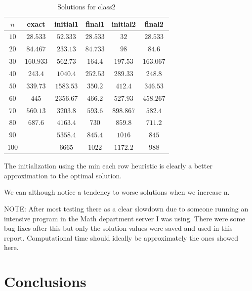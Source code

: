 \documentclass[a4paper, 11pt]{article}
\begin{document}
	\begin{table}[H]
		\centering
		\begin{tabular}{c|c|c|c|c|c}
			\textbf{$ n $} 	& \textbf{exact} & \textbf{initial1}   & \textbf{final1}& \textbf{initial2} & \textbf{final2} 	\\ \hline
			$ 10  $			& $ 28.533 $ 	& $ 52.333 $ 			& $ 28.533 $  	& $ 32 $ 			& $ 28.533 $		\\ \hline
			$ 20  $			& $ 84.467 $ 		& $ 233.13 $ 			& $ 84.733 $  	& $ 98 $ 			& $ 84.6$		\\ \hline
			$ 30  $			& $ 160.933 $ 	& $ 562.73 $ 			& $ 164.4 $  	& $ 197.53 $ 		& $ 163.067 $ \\ \hline
			$ 40  $			& $ 243.4 $ 	& $ 1040.4 $ 			& $ 252.53 $  	& $ 289.33 $ 		& $ 248.8 $ \\ \hline
			$ 50  $			& $ 339.73 $ 		& $ 1583.53 $ 			& $ 350.2 $  	& $ 412.4 $ 		& $ 346.53 $ \\ \hline
			$ 60  $			& $ 445 $ 	& $ 2356.67 $ 			& $ 466.2 $  	& $ 527.93 $ 		& $ 458.267 $ \\ \hline
			$ 70 $			& $ 560.13 $ 	& $ 3203.8 $ 			& $ 593.6 $  	& $ 898.867 $ 		& $ 582.4 $ \\ \hline
			$ 80 $			& $ 687.6 $ 	& $ 4163.4 $ 			& $ 730 $  		& $ 859.8 $ 		& $ 711.2 $ \\ \hline
			$ 90 $			& $  $ 		& $ 5358.4 $ 			& $ 845.4 $  	& $ 1016 $ 			& $ 845 $ \\ \hline
			$ 100 $			& $  $ 	& $ 6665 $ 				& $ 1022 $  	& $ 1172.2 $ 		& $ 988$ \\
		\end{tabular}
		\caption{Solutions for class2}
		\label{table:sols2}
	\end{table}

	The initialization using the min each row heuristic is clearly a better approximation to the optimal solution.
	
	We can although notice a tendency to worse solutions when we increase n.
	
	
	
	
	
	NOTE: After most testing there as a clear slowdown due to someone running an intensive program in the Math department server I was using.
	There were some bug fixes after this but only the solution values were saved and used in this report. 
	Computational time should ideally be approximately the ones showed here.
	
	\section{Conclusions}
	
	
\end{document}
